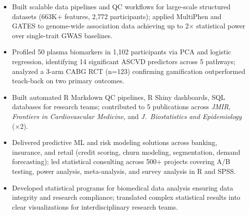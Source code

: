 \documentclass[10pt,a4paper,ragged2e]{altacv}
\begin{document}
\vspace{-5pt}
\divider

\begin{itemize}
\item Built scalable data pipelines and QC workflows for large-scale structured datasets (663K+ features, 2,772 participants); applied MultiPhen and GATES to genome-wide association data achieving up to 2$\times$ statistical power over single-trait GWAS baselines.
\item Profiled 50 plasma biomarkers in 1,102 participants via PCA and logistic regression, identifying 14 significant ASCVD predictors across 5 pathways; analyzed a 3-arm CABG RCT (n=123) confirming gamification outperformed teach-back on two primary outcomes.
\item Built automated R Markdown QC pipelines, R Shiny dashboards, SQL databases for research teams; contributed to 5 publications across \textit{JMIR}, \textit{Frontiers in Cardiovascular Medicine}, and \textit{J.\ Biostatistics and Epidemiology} ($\times$2).
\end{itemize}

\vspace{-5pt}
\divider

\begin{itemize}
\item Delivered predictive ML and risk modeling solutions across banking, insurance, and retail (credit scoring, churn modeling, segmentation, demand forecasting); led statistical consulting across 500+ projects covering A/B testing, power analysis, meta-analysis, and survey analysis in R and SPSS.
\end{itemize}

\vspace{-5pt}
\divider

\begin{itemize}
\item Developed statistical programs for biomedical data analysis ensuring data integrity and research compliance; translated complex statistical results into clear visualizations for interdisciplinary research teams.
\end{itemize}
\clearpage
\end{document}
